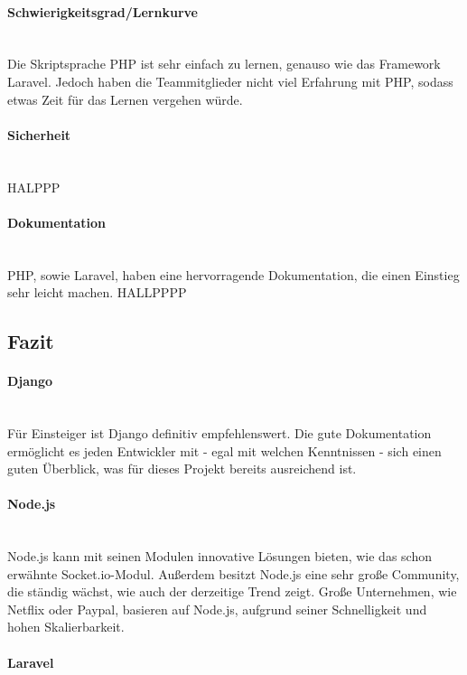 \documentclass[11pt]{article}
\begin{document}
\paragraph{Schwierigkeitsgrad/Lernkurve} \mbox{}\\
Die Skriptsprache PHP ist sehr einfach zu lernen, genauso wie das Framework Laravel. Jedoch haben die Teammitglieder nicht viel Erfahrung mit PHP, sodass etwas Zeit f\"ur das Lernen vergehen w\"urde.

\paragraph{Sicherheit} \mbox{}\\
HALPPP

\paragraph{Dokumentation} \mbox{}\\
PHP, sowie Laravel, haben eine hervorragende Dokumentation, die einen Einstieg sehr leicht machen. HALLPPPP

\subsection{Fazit}
\paragraph{Django} \mbox{}\\
F\"ur Einsteiger ist Django definitiv empfehlenswert. Die gute Dokumentation erm\"oglicht es jeden Entwickler mit - egal mit welchen Kenntnissen - sich einen guten \"Uberblick, was f\"ur dieses Projekt bereits ausreichend ist.
\paragraph{Node.js} \mbox{}\\
Node.js kann mit seinen Modulen innovative L\"osungen bieten, wie das schon erw\"ahnte Socket.io-Modul. Au{\ss}erdem besitzt Node.js eine sehr gro{\ss}e Community, die st\"andig w\"achst, wie auch der derzeitige Trend zeigt. Gro{\ss}e Unternehmen, wie Netflix oder Paypal, basieren auf Node.js, aufgrund seiner Schnelligkeit und hohen Skalierbarkeit.
\paragraph{Laravel} \mbox{}\\
\end{document}
